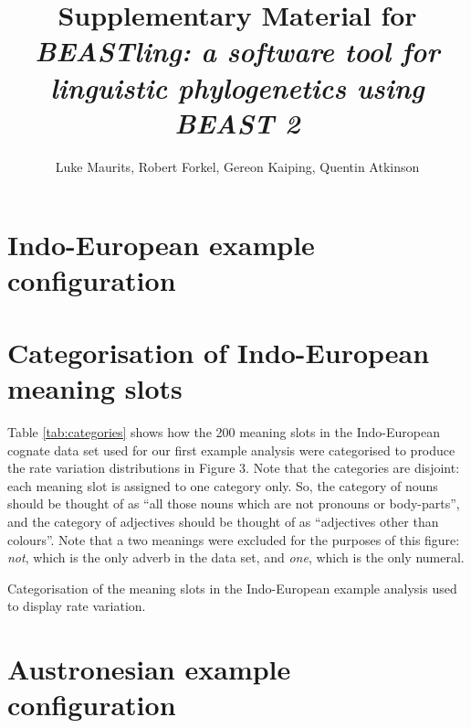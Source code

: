 \documentclass[10pt,a4paper]{article}
\begin{document}
\title{Supplementary Material for \emph{BEASTling: a software tool for linguistic phylogenetics using BEAST 2}}
\author{Luke Maurits, Robert Forkel, Gereon Kaiping, Quentin Atkinson}
\maketitle

\section{Indo-European example configuration}

\begin{alltt}

\end{alltt}

\section{Categorisation of Indo-European meaning slots}

Table \ref{tab:categories} shows how the 200 meaning slots in the Indo-European cognate data set used for our first example analysis were categorised to produce the rate variation distributions in Figure 3.  Note that the categories are disjoint: each meaning slot is assigned to one category only.  So, the category of nouns should be thought of as ``all those nouns which are not pronouns or body-parts'', and the category of adjectives should be thought of as ``adjectives other than colours''.  Note that a two meanings were excluded for the purposes of this figure: \emph{not}, which is the only adverb in the data set, and \emph{one}, which is the only numeral. 

\begin{table}[]
	\begin{center}
	\small
	
	\end{center}
	\caption{Categorisation of the meaning slots in the Indo-European example analysis used to display rate variation.}
\label{tab:categories}
\end{table}

\section{Austronesian example configuration}

\begin{alltt}

\end{alltt}
\end{document}
